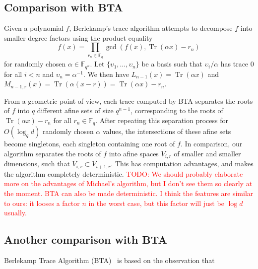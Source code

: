 \documentclass{sig-alternate}
\newcommand{\ff}[1]{\mathbb{F}_{#1}}
\newcommand{\fq}{\ff{q}}
\newcommand{\fqn}{\ff{q^n}}
\newcommand{\dd}{d}
\newcommand{\qq}{q}
\newcommand{\nn}{n}
\DeclareMathOperator{\Tr}{Tr}
\newcounter{algo}
\newcommand{\todo}[1]{\textcolor{red}{TODO: #1}}
\begin{document}
\subsection{Comparison with BTA}

Given a polynomial $f$, Berlekamp's trace algorithm attempts to decompose $f$ into smaller degree factors using the product equality
$$f(x)=\prod_{r_n\in\fq}\gcd\left(f(x),\Tr(\alpha x)-r_n\right)$$
for randomly chosen $\alpha\in\fqn$.
%
Let $\{\upsilon_1,\ldots,\upsilon_{\nn}\}$ be a basis such that $\upsilon_i/\alpha$ has trace 0 for all $i<\nn$ and $\upsilon_\nn=\alpha^{-1}$. We then have $L_{\nn-1}(x)=\Tr(\alpha x)$ and $M_{\nn-1,r}(x)=\Tr(\alpha (x-r))=\Tr(\alpha x)-r_\nn$.

From a geometric point of view, each trace computed by BTA separates the roots of $f$ into $q$ different afine sets of size $\qq^{\nn-1}$, corresponding to the roots of $\Tr(\alpha x)-r_\nn$ for all $r_\nn\in\fq$. After repeating this separation process for $O(\log_\qq\dd)$  randomly chosen $\alpha$ values, the intersections of these afine sets become singletons, each singleton containing one root of $f$. 
%
In comparison, our algorithm separates the roots of $f$ into afine spaces $V_{i,r}$ of smaller and smaller dimensions, such that $V_{i,r}\subset V_{i+1,r}$. This has computation advantages, and makes the algorithm completely deterministic.
%
\todo{We should probably elaborate more on the advantages of Michael's algorithm, but I don't see them so clearly at the moment. BTA can also be made deterministic. I think the features are similar to ours: it looses a factor $n$ in the worst case, but this factor will just be $\log d$ usually.}


\subsection{Another comparison with BTA}


Berlekamp Trace Algorithm (BTA)~\cite{berl70} is based on the observation that
\end{document}
